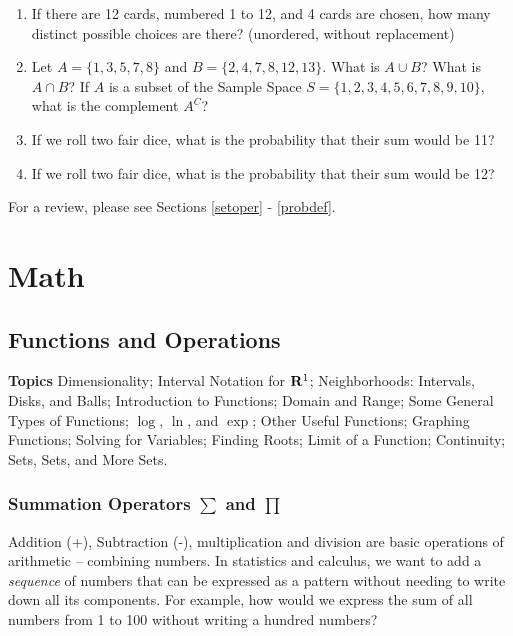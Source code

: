 \documentclass[]{book}
\providecommand{\tightlist}{%
  \setlength{\itemsep}{0pt}\setlength{\parskip}{0pt}}
\theoremstyle{definition}
\theoremstyle{definition}
\theoremstyle{definition}
\theoremstyle{remark}
\begin{document}
\begin{enumerate}
\def\labelenumi{\arabic{enumi}.}
\tightlist
\item
  If there are 12 cards, numbered 1 to 12, and 4 cards are chosen, how
  many distinct possible choices are there? (unordered, without
  replacement)
\item
  Let \(A = \{1,3,5,7,8\}\) and \(B = \{2,4,7,8,12,13\}\). What is
  \(A \cup B\)? What is \(A \cap B\)? If \(A\) is a subset of the Sample
  Space \(S = \{1,2,3,4,5,6,7,8,9,10\}\), what is the complement
  \(A^C\)?
\item
  If we roll two fair dice, what is the probability that their sum would
  be 11?
\item
  If we roll two fair dice, what is the probability that their sum would
  be 12?
\end{enumerate}

For a review, please see Sections \ref{setoper} - \ref{probdef}.

\part{Math}\label{part-math}

\chapter{Functions and Operations}\label{functions-and-operations}

\textbf{Topics} Dimensionality; Interval Notation for \({\bf R}^1\);
Neighborhoods: Intervals, Disks, and Balls; Introduction to Functions;
Domain and Range; Some General Types of Functions; \(\log\), \(\ln\),
and \(\exp\); Other Useful Functions; Graphing Functions; Solving for
Variables; Finding Roots; Limit of a Function; Continuity; Sets, Sets,
and More Sets.

\section{\texorpdfstring{Summation Operators \(\sum\) and
\(\prod\)}{Summation Operators \textbackslash{}sum and \textbackslash{}prod}}\label{sum-notation}

Addition (+), Subtraction (-), multiplication and division are basic
operations of arithmetic -- combining numbers. In statistics and
calculus, we want to add a \emph{sequence} of numbers that can be
expressed as a pattern without needing to write down all its components.
For example, how would we express the sum of all numbers from 1 to 100
without writing a hundred numbers?
\end{document}

